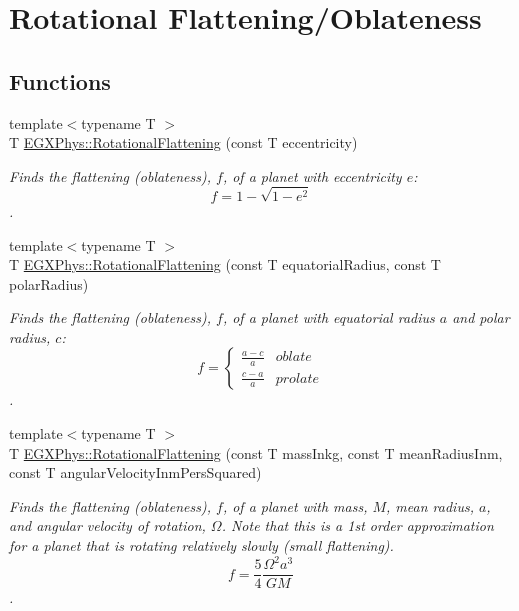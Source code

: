 \hypertarget{group___e_g_x_phys-_astrophysics-_rotational_flattening}{}\section{Rotational Flattening/\+Oblateness}
\label{group___e_g_x_phys-_astrophysics-_rotational_flattening}
\subsection*{Functions}
\begin{DoxyCompactItemize}
\item 
{\footnotesize template$<$typename T $>$ }\\T \mbox{\hyperlink{group___e_g_x_phys-_astrophysics-_rotational_flattening_gabba90db442c4ec9e12523adb00d66c44}{E\+G\+X\+Phys\+::\+Rotational\+Flattening}} (const T eccentricity)
\begin{DoxyCompactList}\small\item\em Finds the flattening (oblateness), $f$, of a planet with eccentricity $e$\+: \[ f = 1 - \sqrt{1-e^2} \]. \end{DoxyCompactList}\item 
{\footnotesize template$<$typename T $>$ }\\T \mbox{\hyperlink{group___e_g_x_phys-_astrophysics-_rotational_flattening_ga1840fed2081c35f68c4b8bfa75248977}{E\+G\+X\+Phys\+::\+Rotational\+Flattening}} (const T equatorial\+Radius, const T polar\+Radius)
\begin{DoxyCompactList}\small\item\em Finds the flattening (oblateness), $f$, of a planet with equatorial radius $a$ and polar radius, $c$\+: \[ f =\begin{cases} \frac{a-c}{a}{} & oblate \\ \frac{c-a}{a} & prolate \end{cases} \]. \end{DoxyCompactList}\item 
{\footnotesize template$<$typename T $>$ }\\T \mbox{\hyperlink{group___e_g_x_phys-_astrophysics-_rotational_flattening_ga316b9afb6e1aa940fa96417c6f24ed4d}{E\+G\+X\+Phys\+::\+Rotational\+Flattening}} (const T mass\+Inkg, const T mean\+Radius\+Inm, const T angular\+Velocity\+Inm\+Pers\+Squared)
\begin{DoxyCompactList}\small\item\em Finds the flattening (oblateness), $f$, of a planet with mass, $M$, mean radius, $a$, and angular velocity of rotation, $\Omega$. Note that this is a 1st order approximation for a planet that is rotating relatively slowly (small flattening). \[ f = \frac{5}{4} \frac{\Omega^2 a^3}{GM} \]. \end{DoxyCompactList}\item 

\end{DoxyCompactItemize}
